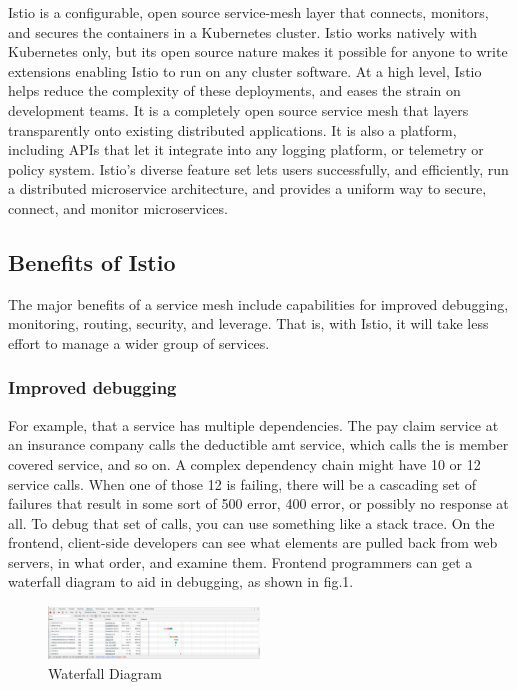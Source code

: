 \documentclass[conference]{IEEEtran}
\begin{document}
Istio is a configurable, open source service-mesh layer that connects, monitors, and secures the containers in a Kubernetes cluster. Istio works natively with Kubernetes only, but its open source nature makes it possible for anyone to write extensions enabling Istio to run on any cluster software.\cite{IBM}
At a high level, Istio helps reduce the complexity of these deployments, and eases the strain on development teams. It is a completely open source service mesh that layers transparently onto existing distributed applications. It is also a platform, including APIs that let it integrate into any logging platform, or telemetry or policy system. Istio’s diverse feature set lets users successfully, and efficiently, run a distributed microservice architecture, and provides a uniform way to secure, connect, and monitor microservices.\cite{Concepts}

\subsection{Benefits of Istio}
The major benefits of a service mesh include capabilities for improved debugging, monitoring, routing, security, and leverage. That is, with Istio, it will take less effort to manage a wider group of services.\cite{Concepts}

\subsubsection{Improved debugging}
For example, that a service has multiple dependencies. The pay claim service at an insurance company calls the deductible amt service, which calls the is member covered service, and so on. A complex dependency chain might have 10 or 12 service calls. When one of those 12 is failing, there will be a cascading set of failures that result in some sort of 500 error, 400 error, or possibly no response at all.
To debug that set of calls, you can use something like a stack trace. On the frontend, client-side developers can see what elements are pulled back from web servers, in what order, and examine them. Frontend programmers can get a waterfall diagram to aid in debugging, as shown in fig.1.\cite{Concepts}
\begin{figure}[htbp]
	\centering
	\includegraphics[width=0.5\textwidth]{figure/1.png}
	\caption{Waterfall Diagram\label{fig:1}}
\end{figure}
\end{document}
